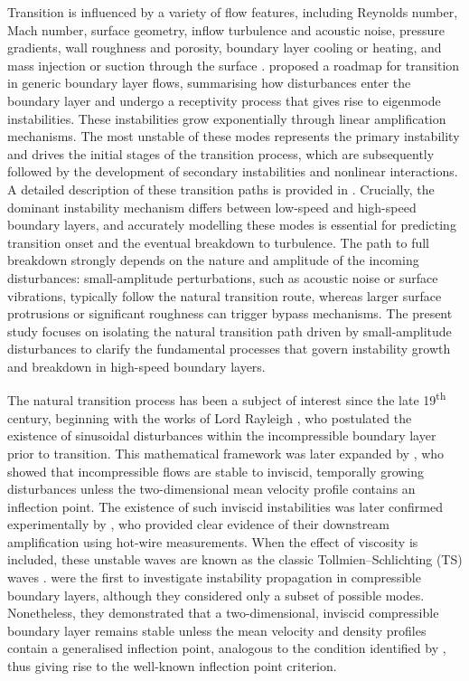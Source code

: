 Transition is influenced by a variety of flow features, including Reynolds number, Mach number, surface geometry, inflow turbulence and acoustic noise, pressure gradients, wall roughness and porosity, boundary layer cooling or heating, and mass injection or suction through the surface \citep{Cebeci2001}. \citet{Morkovin1994} proposed a roadmap for transition in generic boundary layer flows, summarising how disturbances enter the boundary layer and undergo a receptivity process that gives rise to eigenmode instabilities. These instabilities grow exponentially through linear amplification mechanisms. The most unstable of these modes represents the primary instability and drives the initial stages of the transition process, which are subsequently followed by the development of secondary instabilities and nonlinear interactions. A detailed description of these transition paths is provided in . Crucially, the dominant instability mechanism differs between low-speed and high-speed boundary layers, and accurately modelling these modes is essential for predicting transition onset and the eventual breakdown to turbulence. The path to full breakdown strongly depends on the nature and amplitude of the incoming disturbances: small-amplitude perturbations, such as acoustic noise or surface vibrations, typically follow the natural transition route, whereas larger surface protrusions or significant roughness can trigger bypass mechanisms. The present study focuses on isolating the natural transition path driven by small-amplitude disturbances to clarify the fundamental processes that govern instability growth and breakdown in high-speed boundary layers.

The natural transition process has been a subject of interest since the late 19\textsuperscript{th} century, beginning with the works of Lord Rayleigh \citep{Rayleigh1878,Rayleigh1880}, who postulated the existence of sinusoidal disturbances within the incompressible boundary layer prior to transition. This mathematical framework was later expanded by \citet{Tollmien1936}, who showed that incompressible flows are stable to inviscid, temporally growing disturbances unless the two-dimensional mean velocity profile contains an inflection point. The existence of such inviscid instabilities was later confirmed experimentally by \citet{Schubauer1948}, who provided clear evidence of their downstream amplification using hot-wire measurements. When the effect of viscosity is included, these unstable waves are known as the classic Tollmien–Schlichting (TS) waves \citep{Schlichting2000}. \citet{LeesLin1946} were the first to investigate instability propagation in compressible boundary layers, although they considered only a subset of possible modes. Nonetheless, they demonstrated that a two-dimensional, inviscid compressible boundary layer remains stable unless the mean velocity and density profiles contain a generalised inflection point, analogous to the condition identified by \citet{Tollmien1936}, thus giving rise to the well-known inflection point criterion.

